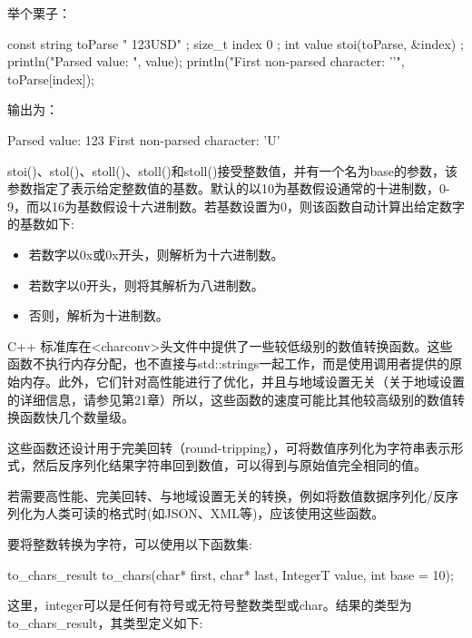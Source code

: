 举个栗子：

\begin{cpp}
const string toParse { " 123USD" };
size_t index { 0 };
int value { stoi(toParse, &index) };
println("Parsed value: {}", value);
println("First non-parsed character: '{}'", toParse[index]);
\end{cpp}

输出为：

\begin{shell}
Parsed value: 123
First non-parsed character: 'U'
\end{shell}

stoi()、stol()、stoll()、stoll()和stoll()接受整数值，并有一个名为base的参数，该参数指定了表示给定整数值的基数。默认的以10为基数假设通常的十进制数，0-9，而以16为基数假设十六进制数。若基数设置为0，则该函数自动计算出给定数字的基数如下:

\begin{itemize}
\item
若数字以0x或0x开头，则解析为十六进制数。

\item
若数字以0开头，则将其解析为八进制数。

\item
否则，解析为十进制数。
\end{itemize}


C++ 标准库在<charconv>头文件中提供了一些较低级别的数值转换函数。这些函数不执行内存分配，也不直接与std::strings一起工作，而是使用调用者提供的原始内存。此外，它们针对高性能进行了优化，并且与地域设置无关（关于地域设置的详细信息，请参见第21章）所以，这些函数的速度可能比其他较高级别的数值转换函数快几个数量级。

这些函数还设计用于完美回转（round-tripping），可将数值序列化为字符串表示形式，然后反序列化结果字符串回到数值，可以得到与原始值完全相同的值。

若需要高性能、完美回转、与地域设置无关的转换，例如将数值数据序列化/反序列化为人类可读的格式时(如JSON、XML等)，应该使用这些函数。


要将整数转换为字符，可以使用以下函数集:

\begin{cpp}
to_chars_result to_chars(char* first, char* last, IntegerT value, int base = 10);
\end{cpp}

这里，integer可以是任何有符号或无符号整数类型或char。结果的类型为to\_chars\_result，其类型定义如下:

